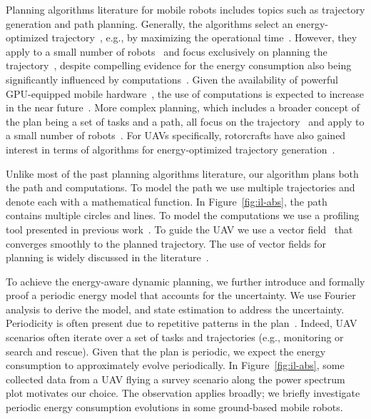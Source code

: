 \documentclass[letterpaper,10pt,conference]{ieeeconf}
\theoremstyle{definition}
\begin{document}
Planning algorithms literature for mobile robots includes topics such as trajectory generation and path planning. Generally, the algorithms select an energy-optimized trajectory~\cite{mei2004energy}, e.g., by maximizing the operational time~\cite{wahab2015energy}. However, they apply to a small number of robots~\cite{kim2005energy} and focus exclusively on planning the trajectory~\cite{kim2008minimum}, despite compelling evidence for the energy consumption also being significantly influenced by computations~\cite{mei2005case}. Given the availability of powerful GPU-equipped mobile hardware~\cite{rizvi2017general}, the use of computations is expected to increase in the near future~\cite{abramov2012real,satria2016real,jaramillo2019visual}. More complex planning, which includes a broader concept of the plan being a set of tasks and a path, all focus on the trajectory~\cite{mei2005case,mei2006deployment} and apply to a small number of robots~\cite{sadrpour2013mission,sadrpour2013experimental}. For UAVs specifically, rotorcrafts have also gained interest in terms of algorithms for energy-optimized trajectory generation~\cite{morbidi2016minimum,kreciglowa2017energy}. 

Unlike most of the past planning algorithms literature, our algorithm plans both the path and computations. To model the path we use multiple trajectories and denote each with a mathematical function. In Figure~\ref{fig:il-abs}, the path contains multiple circles and lines. To model the computations we use a profiling tool presented in previous work~\cite{seewald2019coarse}. To guide the UAV we use a vector field~\cite{de2017guidance} that converges smoothly to the planned trajectory. The use of vector fields for planning is widely discussed in the literature~\cite{lindemann2005smoothly,gonccalves2010vector,panagou2014motion,zhou2014vector,kapitanyuk2017guiding,de2017guidance}. 

To achieve the energy-aware dynamic planning, we further introduce and formally proof a periodic energy model that accounts for the uncertainty. We use Fourier analysis to derive the model, and state estimation to address the uncertainty. Periodicity is often present due to repetitive patterns in the plan~\cite{seewald2020mechanical}. Indeed, UAV scenarios often iterate over a set of tasks and trajectories (e.g., monitoring or search and rescue). Given that the plan is periodic, we expect the energy consumption to approximately evolve periodically. In Figure~\ref{fig:il-abs}, some collected data from a UAV flying a survey scenario along the power spectrum plot motivates our choice. The observation applies broadly; we briefly investigate periodic energy consumption evolutions in some ground-based mobile robots.
\end{document}
